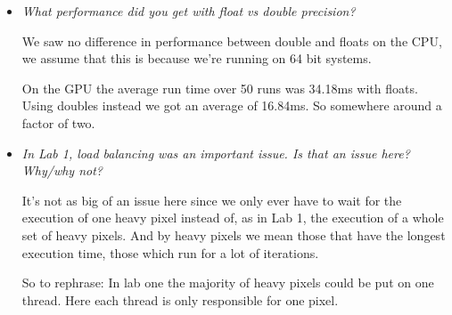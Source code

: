 \documentclass[a4paper,12pt]{article}
\begin{document}
\begin{itemize}
\item \textit{What performance did you get with float vs double precision?}

  We saw no difference in performance between double and floats on the CPU, we assume that this is because we're running on 64 bit systems.

  On the GPU the average run time over 50 runs was 34.18ms with floats. Using doubles instead we got an average of 16.84ms. So somewhere around a factor of two.


\item \textit{In Lab 1, load balancing was an important issue. Is that an issue here? Why/why not?}

  It's not as big of an issue here since we only ever have to wait for the execution of one heavy pixel instead of, as in Lab 1, the execution of a whole set of heavy pixels. And by heavy pixels we mean those that have the longest execution time, those which run for a lot of iterations.

  So to rephrase: In lab one the majority of heavy pixels could be put on one thread. Here each thread is only responsible for one pixel.

\end{itemize}
\end{document}
